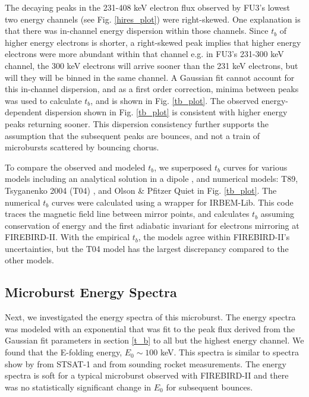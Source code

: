 The decaying peaks in the 231-408 keV electron flux observed by FU3's lowest two energy channels (see Fig. \ref{hires_plot}) were right-skewed. One explanation is that there was in-channel energy dispersion within those channels. Since $t_b$ of higher energy electrons is shorter, a right-skewed peak implies that higher energy electrons were more abundant within that channel e.g. in FU3's 231-300 keV channel, the 300 keV electrons will arrive sooner than the 231 keV electrons, but will they will be binned in the same channel. A Gaussian fit cannot account for this in-channel dispersion, and as a first order correction, minima between peaks was used to calculate $t_b$, and is shown in Fig. \ref{tb_plot}. The observed energy-dependent dispersion shown in Fig. \ref{tb_plot} is consistent with higher energy peaks returning sooner. This dispersion consistency further supports the assumption that the subsequent peaks are bounces, and not a train of microbursts scattered by bouncing chorus.

To compare the observed and modeled $t_b$, we superposed $t_b$ curves for various models including an analytical solution in a dipole \citep{Schulz1974}, and numerical models: T89, Tsyganenko 2004 (T04) \citep{Tsyganenko2005}, and Olson \& Pfitzer Quiet \citep{Olson1982} in Fig. \ref{tb_plot}. The numerical $t_b$ curves were calculated using a wrapper for IRBEM-Lib. This code traces the magnetic field line between mirror points, and calculates $t_b$ assuming conservation of energy and the first adiabatic invariant for electrons mirroring at FIREBIRD-II. With the empirical $t_b$, the models agree within FIREBIRD-II's uncertainties, but the T04 model has the largest discrepancy compared to the other models.

\subsection{Microburst Energy Spectra}
Next, we investigated the energy spectra of this microburst. The energy spectra was modeled with an exponential that was fit to the peak flux derived from the Gaussian fit parameters in section \ref{t_b} to all but the highest energy channel. We found that the E-folding energy, $E_0 \sim 100$ keV. This spectra is similar to spectra show by \citet{Lee2005} from STSAT-1 and \citet{Datta1997} from sounding rocket measurements. The energy spectra is soft for a typical microburst observed with FIREBIRD-II and there was no statistically significant change in $E_0$ for subsequent bounces.

